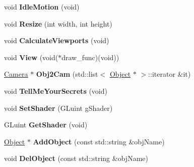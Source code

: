 \begin{DoxyCompactItemize}
\item 
\hypertarget{class_cameras_acb3907c96b7d147b7bcc1aad42f8da6f}{void {\bfseries Idle\-Motion} (void)}\label{class_cameras_acb3907c96b7d147b7bcc1aad42f8da6f}

\item 
\hypertarget{class_cameras_a72155a9003f5976b455482d65d0a61ff}{void {\bfseries Resize} (int width, int height)}\label{class_cameras_a72155a9003f5976b455482d65d0a61ff}

\item 
\hypertarget{class_cameras_ab3bdf41248da9246efeeea4302136c11}{void {\bfseries Calculate\-Viewports} (void)}\label{class_cameras_ab3bdf41248da9246efeeea4302136c11}

\item 
\hypertarget{class_cameras_a817c8f00c258c19fc448286bec966d9f}{void {\bfseries View} (void($\ast$draw\-\_\-func)(void))}\label{class_cameras_a817c8f00c258c19fc448286bec966d9f}

\item 
\hypertarget{class_cameras_a26853a905f205514b2ed1c1ac0eb0847}{\hyperlink{class_camera}{Camera} $\ast$ {\bfseries Obj2\-Cam} (std\-::list$<$ \hyperlink{class_object}{Object} $\ast$ $>$\-::iterator \&it)}\label{class_cameras_a26853a905f205514b2ed1c1ac0eb0847}

\item 
\hypertarget{class_cameras_ad5d4d6b1bb03660ad5c7eb6765920c7c}{void {\bfseries Tell\-Me\-Your\-Secrets} (void)}\label{class_cameras_ad5d4d6b1bb03660ad5c7eb6765920c7c}

\item 
\hypertarget{class_scene_a3010030e68d0468b8d18c1323e072e80}{void {\bfseries Set\-Shader} (G\-Luint g\-Shader)}\label{class_scene_a3010030e68d0468b8d18c1323e072e80}

\item 
\hypertarget{class_scene_a1debf8bc8a9cb168ebbbcda1b4ffd605}{G\-Luint {\bfseries Get\-Shader} (void)}\label{class_scene_a1debf8bc8a9cb168ebbbcda1b4ffd605}

\item 
\hypertarget{class_scene_a2a3a5e4f5ea44d086ff73f2420663a10}{\hyperlink{class_object}{Object} $\ast$ {\bfseries Add\-Object} (const std\-::string \&obj\-Name)}\label{class_scene_a2a3a5e4f5ea44d086ff73f2420663a10}

\item 
\hypertarget{class_scene_a3bd9fa1058f506c04162b9283e97d20e}{void {\bfseries Del\-Object} (const std\-::string \&obj\-Name)}\label{class_scene_a3bd9fa1058f506c04162b9283e97d20e}


\end{DoxyCompactItemize}
